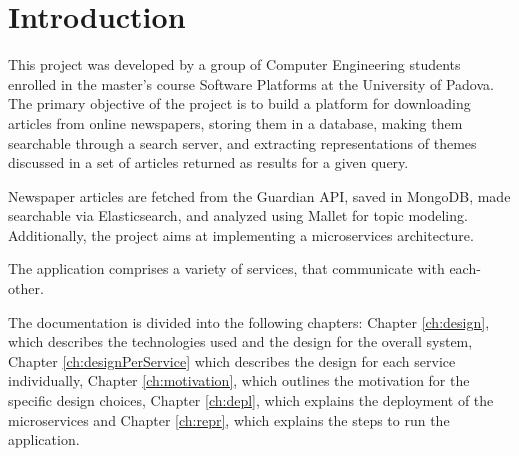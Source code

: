 \section{Introduction}
\label{ch:in}
This project was developed by a group of Computer Engineering students enrolled in the master's
course Software Platforms at the University of Padova. The primary objective of the project is
to build a platform for downloading articles from online newspapers, storing them in a database,
making them searchable through a search server, and extracting representations of themes discussed
in a set of articles returned as results for a given query.

Newspaper articles are fetched from the Guardian API, saved in MongoDB, made searchable via
Elasticsearch, and analyzed using Mallet for topic modeling.
Additionally, the project aims at
implementing a microservices architecture.

The application comprises a variety of services, that communicate with each-other.


The documentation is divided into the following chapters: Chapter \ref{ch:design},
which describes the technologies used and the design for the overall system, Chapter
\ref{ch:designPerService} which describes the design
 for each service individually, Chapter \ref{ch:motivation}, which outlines the motivation
 for the specific design choices, Chapter \ref{ch:depl}, which explains the deployment
 of the microservices and Chapter \ref{ch:repr},
 which explains the steps to run the application.